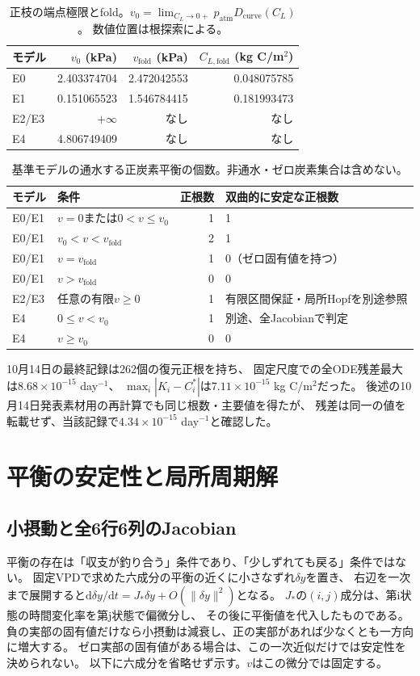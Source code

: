 \documentclass[a4paper,11pt]{ltjsarticle}
\newcommand{\dd}{\mathrm{d}}
\begin{document}
\begin{table}[tb]
\centering
\caption{正枝の端点極限とfold。$v_0=\lim_{C_L\to0+}p_{\mathrm{atm}}D_{\mathrm{curve}}(C_L)$。
数値位置は根探索による。}\label{tab:landmarks}
\begin{tabular}{lrrr}
\toprule
モデル&$v_0$ (kPa)&$v_{\mathrm{fold}}$ (kPa)&$C_{L,\mathrm{fold}}$ (kg C/m$^2$)\\\midrule
E0&2.403374704&2.472042553&0.048075785\\
E1&0.151065523&1.546784415&0.181993473\\
E2/E3&$+\infty$&なし&なし\\
E4&4.806749409&なし&なし\\
\bottomrule
\end{tabular}
\end{table}
\begin{table}[tb]
\centering
\caption{基準モデルの通水する正炭素平衡の個数。非通水・ゼロ炭素集合は含めない。}\label{tab:rootcounts}
\begin{tabular}{llrl}
\toprule
モデル&条件&正根数&双曲的に安定な正根数\\\midrule
E0/E1&$v=0$または$0<v\le v_0$&1&1\\
E0/E1&$v_0<v<v_{\mathrm{fold}}$&2&1\\
E0/E1&$v=v_{\mathrm{fold}}$&1&0（ゼロ固有値を持つ）\\
E0/E1&$v>v_{\mathrm{fold}}$&0&0\\
E2/E3&任意の有限$v\ge0$&1&有限区間保証・局所Hopfを別途参照\\
E4&$0\le v<v_0$&1&別途、全Jacobianで判定\\
E4&$v\ge v_0$&0&0\\
\bottomrule
\end{tabular}
\end{table}
10月14日の最終記録は262個の復元正根を持ち、
固定尺度での全ODE残差最大は$8.68\times10^{-15}$ day$^{-1}$、
$\max_i|K_i-C_i^*|$は$7.11\times10^{-15}$ kg C/m$^2$だった。
後述の10月14日発表素材用の再計算でも同じ根数・主要値を得たが、
残差は同一の値を転載せず、当該記録で$4.34\times10^{-15}$ day$^{-1}$と確認した。

\section{平衡の安定性と局所周期解}\label{sec:stability}
\subsection{小摂動と全6行6列のJacobian}\label{sec:fulljacobian}
平衡の存在は「収支が釣り合う」条件であり、「少しずれても戻る」条件ではない。
固定VPDで求めた六成分の平衡の近くに小さなずれ$\delta y$を置き、
右辺を一次まで展開すると$\dd\delta y/\dd t=J_*\delta y+O(\|\delta y\|^2)$となる。
$J_*$の$(i,j)$成分は、第i状態の時間変化率を第j状態で偏微分し、
その後に平衡値を代入したものである。
負の実部の固有値だけなら小摂動は減衰し、正の実部があれば少なくとも一方向に増大する。
ゼロ実部の固有値がある場合は、この一次近似だけでは安定性を決められない。
以下に六成分を省略せず示す。$v$はこの微分では固定する。
\end{document}
